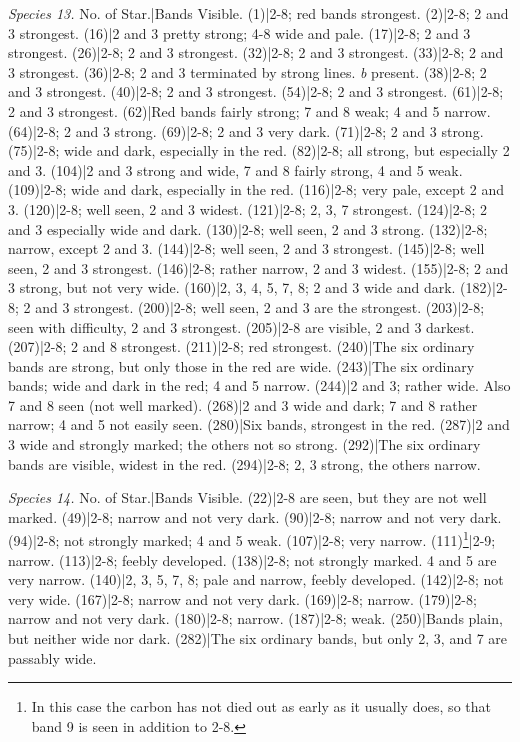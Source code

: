 \documentclass[a4paper, 12pt, oneside, polutonikogreek, english]{article}
\begin{document}
\emph{Species 13.} 
No. of Star.|Bands Visible. 
(1)|2-8; red bands strongest. 
(2)|2-8; 2 and 3 strongest. 
(16)|2 and 3 pretty strong; 4-8 wide and pale. 
(17)|2-8; 2 and 3 strongest. 
(26)|2-8; 2 and 3 strongest. 
(32)|2-8; 2 and 3 strongest. 
(33)|2-8; 2 and 3 strongest. 
(36)|2-8; 2 and 3 terminated by strong lines. \emph{b} present. 
(38)|2-8; 2 and 3 strongest. 
(40)|2-8; 2 and 3 strongest. 
(54)|2-8; 2 and 3 strongest. 
(61)|2-8; 2 and 3 strongest. 
(62)|Red bands fairly strong; 7 and 8 weak; 4 and 5 narrow. 
(64)|2-8; 2 and 3 strong. 
(69)|2-8; 2 and 3 very dark. 
(71)|2-8; 2 and 3 strong. 
(75)|2-8; wide and dark, especially in the red. 
(82)|2-8; all strong, but especially 2 and 3. 
(104)|2 and 3 strong and wide, 7 and 8 fairly strong, 4 and 5 weak. 
(109)|2-8; wide and dark, especially in the red. 
(116)|2-8; very pale, except 2 and 3. 
(120)|2-8; well seen, 2 and 3 widest. 
(121)|2-8; 2, 3, 7 strongest. 
(124)|2-8; 2 and 3 especially wide and dark. 
(130)|2-8; well seen, 2 and 3 strong. 
(132)|2-8; narrow, except 2 and 3. 
(144)|2-8; well seen, 2 and 3 strongest. 
(145)|2-8; well seen, 2 and 3 strongest. 
(146)|2-8; rather narrow, 2 and 3 widest. 
(155)|2-8; 2 and 3 strong, but not very wide. 
(160)|2, 3, 4, 5, 7, 8; 2 and 3 wide and dark. 
(182)|2-8; 2 and 3 strongest. 
(200)|2-8; well seen, 2 and 3 are the strongest. 
(203)|2-8; seen with difficulty, 2 and 3 strongest. 
(205)|2-8 are visible, 2 and 3 darkest. 
(207)|2-8; 2 and 8 strongest. 
(211)|2-8; red strongest. 
(240)|The six ordinary bands are strong, but only those in the red are wide. 
(243)|The six ordinary bands; wide and dark in the red; 4 and 5 narrow. 
(244)|2 and 3; rather wide. Also 7 and 8 seen (not well marked). 
(268)|2 and 3 wide and dark; 7 and 8 rather narrow; 4 and 5 not easily seen. 
(280)|Six bands, strongest in the red. 
(287)|2 and 3 wide and strongly marked; the others not so strong. 
(292)|The six ordinary bands are visible, widest in the red. 
(294)|2-8; 2, 3 strong, the others narrow. 

\emph{Species 14.} 
No. of Star.|Bands Visible. 
(22)|2-8 are seen, but they are not well marked. 
(49)|2-8; narrow and not very dark. 
(90)|2-8; narrow and not very dark. 
(94)|2-8; not strongly marked; 4 and 5 weak. 
(107)|2-8; very narrow. 
(111)\footnote{In this case the carbon has not died out as early as it usually does, so that band 9 is seen in addition to 2-8.}|2-9; narrow. 
(113)|2-8; feebly developed. 
(138)|2-8; not strongly marked. 4 and 5 are very narrow. 
(140)|2, 3, 5, 7, 8; pale and narrow, feebly developed. 
(142)|2-8; not very wide. 
(167)|2-8; narrow and not very dark. 
(169)|2-8; narrow. 
(179)|2-8; narrow and not very dark. 
(180)|2-8; narrow. 
(187)|2-8; weak. 
(250)|Bands plain, but neither wide nor dark. 
(282)|The six ordinary bands, but only 2, 3, and 7 are passably wide. 
\end{document}
